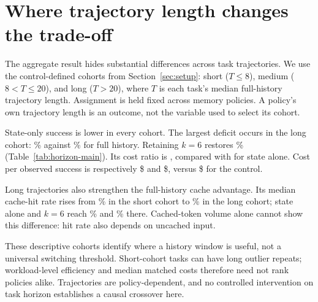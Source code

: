 \section{Where trajectory length changes the trade-off}
\label{sec:horizon}

The aggregate result hides substantial differences across task trajectories.
We use the control-defined cohorts from Section~\ref{sec:setup}: short
($T\leq8$), medium ($8<T\leq20$), and long ($T>20$), where $T$ is each
task's median full-history trajectory length. Assignment is held fixed across
memory policies. A policy's own trajectory length is an outcome, not the
variable used to select its cohort.

\begin{table}[htbp]
\centering\small
\caption{Control-defined trajectory-length cohorts: quality and cost.
All retained outcomes are included. Cost ratio is the median same-task,
same-repeat ratio to full history.}
\label{tab:horizon-main}
\resizebox{\textwidth}{!}{}
\end{table}

State-only success is lower in every cohort. The largest deficit occurs in
the long cohort: \HorizonLongModelStateRate\% against
\HorizonLongModelControlRate\% for full history. Retaining $k=6$ restores
\HorizonLongModelHistorySixRate\% (Table~\ref{tab:horizon-main}). Its cost ratio
is \HorizonLongModelHistorySixAllCostRatio{}, compared with
\HorizonLongModelStateAllCostRatio{} for state alone. Cost per observed success
is respectively \$\HorizonLongModelHistorySixCostPerSuccess{} and
\$\HorizonLongModelStateCostPerSuccess{}, versus
\$\HorizonLongModelControlCostPerSuccess{} for the control.

\begin{table}[htbp]
\centering\small
\caption{The same trajectory-length cohorts: median context and token
measurements. Cache hit is the median per-execution fraction $K/(U+K)$;
token columns are separate medians.}
\label{tab:horizon-cache}
\resizebox{\textwidth}{!}{}
\end{table}

Long trajectories also strengthen the full-history cache advantage.
Its median cache-hit rate rises from \HorizonShortModelControlCacheHit\%
in the short cohort to \HorizonLongModelControlCacheHit\% in the long cohort;
state alone and $k=6$ reach \HorizonLongModelStateCacheHit\% and
\HorizonLongModelHistorySixCacheHit\% there. Cached-token volume alone cannot
show this difference: hit rate also depends on uncached input.

These descriptive cohorts identify where a history window is useful, not a
universal switching threshold. Short-cohort tasks can have long outlier
repeats; workload-level efficiency and median matched costs therefore need
not rank policies alike. Trajectories are policy-dependent, and no controlled
intervention on task horizon establishes a causal crossover here.
